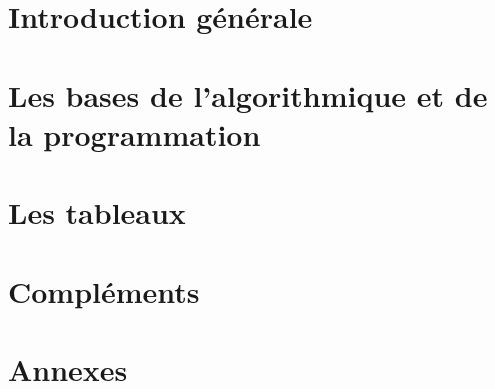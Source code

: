 \documentclass[a4paper,doubleside,11pt]{book}
\begin{document}

	
	
	

	\part{Introduction générale}	
		
		

	\part{Les bases de l'algorithmique et de la programmation}
		
		
		
		
		
		
		

	\part{Les tableaux}
		
		
		
			
	\part{Compléments}
		

	\appendix
	
	\part{Annexes}
		
		
		
	
	
	
\end{document}
